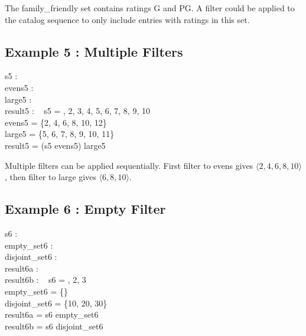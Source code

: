 \documentclass[a4paper,10pt,fleqn]{article}
\begin{document}
\noindent The family\_friendly set contains ratings G and PG. A filter could be applied to the catalog sequence to only include entries with ratings in this set.

\bigskip

\subsection*{Example 5 : Multiple Filters}

\begin{axdef}
s5 : \seq~\nat \\
evens5 : \power \nat \\
large5 : \power \nat \\
result5 : \seq~\nat
\where
s5 = , 2, 3, 4, 5, 6, 7, 8, 9, 10 \rangle \land \\
\quad evens5 = \{2, 4, 6, 8, 10, 12\} \land \\
\quad large5 = \{5, 6, 7, 8, 9, 10, 11\} \land \\
\quad result5 = (s5 \filter evens5) \filter large5
\end{axdef}

\noindent Multiple filters can be applied sequentially. First filter to evens gives $\langle 2, 4, 6, 8, 10 \rangle$, then filter to large gives $\langle 6, 8, 10 \rangle$.

\bigskip

\subsection*{Example 6 : Empty Filter}

\begin{axdef}
s6 : \seq~\nat \\
empty\_set6 : \power \nat \\
disjoint\_set6 : \power \nat \\
result6a : \seq~\nat \\
result6b : \seq~\nat
\where
s6 = , 2, 3 \rangle \land \\
\quad empty\_set6 = \{\} \land \\
\quad disjoint\_set6 = \{10, 20, 30\} \land \\
\quad result6a = s6 \filter empty\_set6 \land \\
\quad result6b = s6 \filter disjoint\_set6
\end{axdef}
\end{document}
